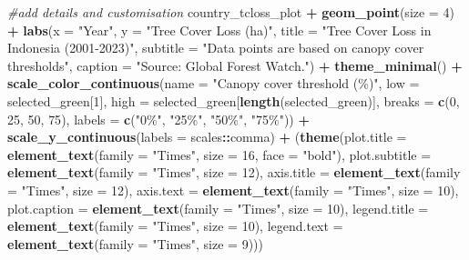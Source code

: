 \documentclass[
]{article}
\newenvironment{Shaded}{\begin{snugshade}}{\end{snugshade}}
\newcommand{\AttributeTok}[1]{\textcolor[rgb]{0.13,0.29,0.53}{#1}}
\newcommand{\CommentTok}[1]{\textcolor[rgb]{0.56,0.35,0.01}{\textit{#1}}}
\newcommand{\DecValTok}[1]{\textcolor[rgb]{0.00,0.00,0.81}{#1}}
\newcommand{\FunctionTok}[1]{\textcolor[rgb]{0.13,0.29,0.53}{\textbf{#1}}}
\newcommand{\NormalTok}[1]{#1}
\newcommand{\SpecialCharTok}[1]{\textcolor[rgb]{0.81,0.36,0.00}{\textbf{#1}}}
\newcommand{\StringTok}[1]{\textcolor[rgb]{0.31,0.60,0.02}{#1}}
\begin{document}
\begin{Shaded}
\begin{Highlighting}[]
\CommentTok{\#add details and customisation}
\NormalTok{country\_tcloss\_plot }\SpecialCharTok{+} 
  \FunctionTok{geom\_point}\NormalTok{(}\AttributeTok{size =} \DecValTok{4}\NormalTok{) }\SpecialCharTok{+} 
  \FunctionTok{labs}\NormalTok{(}\AttributeTok{x =} \StringTok{"Year"}\NormalTok{, }\AttributeTok{y =} \StringTok{"Tree Cover Loss (ha)"}\NormalTok{,}
       \AttributeTok{title =} \StringTok{"Tree Cover Loss in Indonesia (2001{-}2023)"}\NormalTok{,}
       \AttributeTok{subtitle =} \StringTok{"Data points are based on canopy cover thresholds"}\NormalTok{,}
       \AttributeTok{caption =} \StringTok{"Source: Global Forest Watch."}\NormalTok{) }\SpecialCharTok{+}
  \FunctionTok{theme\_minimal}\NormalTok{() }\SpecialCharTok{+}
  \FunctionTok{scale\_color\_continuous}\NormalTok{(}\AttributeTok{name =} \StringTok{"Canopy cover threshold (\%)"}\NormalTok{, }\AttributeTok{low =}\NormalTok{ selected\_green[}\DecValTok{1}\NormalTok{], }
                         \AttributeTok{high =}\NormalTok{ selected\_green[}\FunctionTok{length}\NormalTok{(selected\_green)], }
                         \AttributeTok{breaks =} \FunctionTok{c}\NormalTok{(}\DecValTok{0}\NormalTok{, }\DecValTok{25}\NormalTok{, }\DecValTok{50}\NormalTok{, }\DecValTok{75}\NormalTok{), }
                         \AttributeTok{labels =} \FunctionTok{c}\NormalTok{(}\StringTok{"0\%"}\NormalTok{, }\StringTok{"25\%"}\NormalTok{, }\StringTok{"50\%"}\NormalTok{, }\StringTok{"75\%"}\NormalTok{)) }\SpecialCharTok{+} 
  \FunctionTok{scale\_y\_continuous}\NormalTok{(}\AttributeTok{labels =}\NormalTok{ scales}\SpecialCharTok{::}\NormalTok{comma) }\SpecialCharTok{+}
\NormalTok{   (}\FunctionTok{theme}\NormalTok{(}\AttributeTok{plot.title =} \FunctionTok{element\_text}\NormalTok{(}\AttributeTok{family =} \StringTok{"Times"}\NormalTok{, }\AttributeTok{size =} \DecValTok{16}\NormalTok{, }\AttributeTok{face =} \StringTok{"bold"}\NormalTok{),}
         \AttributeTok{plot.subtitle =} \FunctionTok{element\_text}\NormalTok{(}\AttributeTok{family =} \StringTok{"Times"}\NormalTok{, }\AttributeTok{size =} \DecValTok{12}\NormalTok{),}
         \AttributeTok{axis.title =} \FunctionTok{element\_text}\NormalTok{(}\AttributeTok{family =} \StringTok{"Times"}\NormalTok{, }\AttributeTok{size =} \DecValTok{12}\NormalTok{),}
         \AttributeTok{axis.text =} \FunctionTok{element\_text}\NormalTok{(}\AttributeTok{family =} \StringTok{"Times"}\NormalTok{, }\AttributeTok{size =} \DecValTok{10}\NormalTok{), }
         \AttributeTok{plot.caption =} \FunctionTok{element\_text}\NormalTok{(}\AttributeTok{family =} \StringTok{"Times"}\NormalTok{, }\AttributeTok{size =} \DecValTok{10}\NormalTok{),}
         \AttributeTok{legend.title =} \FunctionTok{element\_text}\NormalTok{(}\AttributeTok{family =} \StringTok{"Times"}\NormalTok{, }\AttributeTok{size =} \DecValTok{10}\NormalTok{),}
         \AttributeTok{legend.text =} \FunctionTok{element\_text}\NormalTok{(}\AttributeTok{family =} \StringTok{"Times"}\NormalTok{, }\AttributeTok{size =} \DecValTok{9}\NormalTok{))) }
\end{Highlighting}
\end{Shaded}
\end{document}
